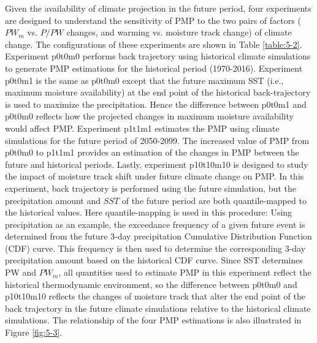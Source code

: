 Given the availability of climate projection in the future period, four experiments are designed to understand the sensitivity of PMP to the two pairs of factors ($PW_m$ vs. $P/PW$ changes, and warming vs. moisture track change) of climate change. The configurations of these experiments are shown in Table \ref{table:5-2}. Experiment p0t0m0 performs back trajectory using historical climate simulations to generate PMP estimations for the historical period (1970-2016). Experiment p0t0m1 is the same as p0t0m0 except that the future maximum SST (i.e., maximum moisture availability) at the end point of the historical back-trajectory is used to maximize the precipitation. Hence the difference between p0t0m1 and p0t0m0 reflects how the projected changes in maximum moisture availability would affect PMP. Experiment p1t1m1 estimates the PMP using climate simulations for the future period of 2050-2099. The increased value of PMP from p0t0m0 to p1t1m1 provides an estimation of the changes in PMP between the future and historical periods. Lastly, experiment p10t10m10 is designed to study the impact of moisture track shift under future climate change on PMP. In this experiment, back trajectory is performed using the future simulation, but the precipitation amount and $SST$ of the future period are both quantile-mapped to the historical values. Here quantile-mapping is used in this procedure: Using precipitation as an example, the exceedance frequency of a given future event is determined from the future 3-day precipitation Cumulative Distribution Function (CDF) curve. This frequency is then used to determine the corresponding 3-day precipitation amount based on the historical CDF curve. Since SST determines PW and $PW_m$, all quantities used to estimate PMP in this experiment reflect the historical thermodynamic environment, so the difference between p0t0m0 and p10t10m10 reflects the changes of moisture track that alter the end point of the back trajectory in the future climate simulations relative to the historical climate simulations. The relationship of the four PMP estimations is also illustrated in Figure \ref{fig:5-3}.

